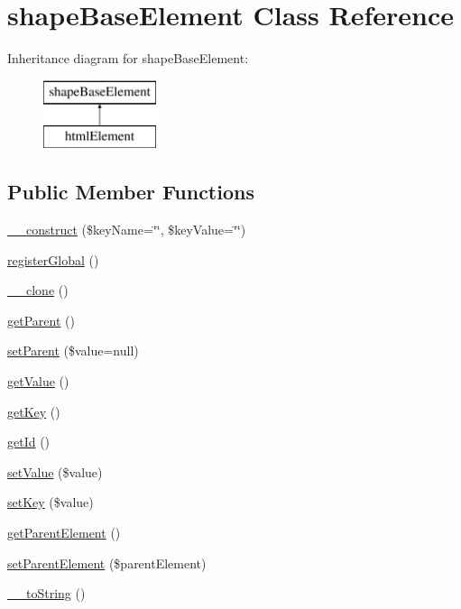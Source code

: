 \hypertarget{classshapeBaseElement}{}\section{shape\+Base\+Element Class Reference}
\label{classshapeBaseElement}
Inheritance diagram for shape\+Base\+Element\+:\begin{figure}[H]
\begin{center}
\leavevmode
\includegraphics[height=2.000000cm]{classshapeBaseElement}
\end{center}
\end{figure}
\subsection*{Public Member Functions}
\begin{DoxyCompactItemize}
\item 
\hyperlink{classshapeBaseElement_a36980020a9e2e1ab0079b7c6abad349e}{\+\_\+\+\_\+construct} (\$key\+Name=\char`\"{}\char`\"{}, \$key\+Value=\char`\"{}\char`\"{})
\item 
\hyperlink{classshapeBaseElement_a4547c40cb33c3d34f16a262d1dcca069}{register\+Global} ()
\item 
\hyperlink{classshapeBaseElement_af4b541a30cda2b49b6dbf1a3fddec344}{\+\_\+\+\_\+clone} ()
\item 
\hyperlink{classshapeBaseElement_a19aff5da3dce4162e9b6f60226bf1a2c}{get\+Parent} ()
\item 
\hyperlink{classshapeBaseElement_a2549412d8c70edfd3c43d9aa84da49df}{set\+Parent} (\$value=null)
\item 
\hyperlink{classshapeBaseElement_ad6ebb79ad6cb2d501f682938d15d4052}{get\+Value} ()
\item 
\hyperlink{classshapeBaseElement_acc89cd4c440d11f1b771410a096db6c9}{get\+Key} ()
\item 
\hyperlink{classshapeBaseElement_a2ed3481fc7f26976cab34075a9fe7215}{get\+Id} ()
\item 
\hyperlink{classshapeBaseElement_a6353680d2dc0774c53f18050d8bf0df3}{set\+Value} (\$value)
\item 
\hyperlink{classshapeBaseElement_a2d50596a8a0e07ad66401e7c680ec68a}{set\+Key} (\$value)
\item 
\hyperlink{classshapeBaseElement_a091d09076b19adff193a373d3d00b6d8}{get\+Parent\+Element} ()
\item 
\hyperlink{classshapeBaseElement_abbfca908d37f102e4a8e7b353c643d68}{set\+Parent\+Element} (\$parent\+Element)
\item 
\hyperlink{classshapeBaseElement_ad3a9484fca483c56b0c8fd7e7deb5965}{\+\_\+\+\_\+to\+String} ()
\end{DoxyCompactItemize}


